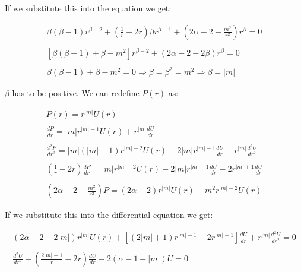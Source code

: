 If we substitute this into the equation we get:

\begin{equation}
  \begin{array}{c}
    \beta(\beta-1)r^{\beta-2}+ \left(\frac{1}{r}-2r\right)\beta r^{\beta-1} + (2\alpha-2-\frac{m^2}{r^2})r^\beta = 0
    \\

    \\
    \left[\beta(\beta-1)+\beta-m^2\right]r^{\beta-2}+(2\alpha-2-2\beta)r^\beta = 0
    \\

    \\
    \beta(\beta-1)+\beta-m^2 = 0 \Rightarrow \beta = \beta^2 = m^2 \Rightarrow \beta = |m|
  \end{array}
\end{equation}

$\beta$ has to be positive. We can redefine $P(r)$ as:

\begin{equation}
  \begin{array}{c}
    P(r) = r^{|m|} U(r)
    \\

    \\
    \frac{d P}{dr} = |m| r^{|m|-1} U(r) + r^{|m|} \frac{dU}{dr}
    \\

    \\
    \frac{d^2 P}{dr^2} = |m| (|m|-1) r^{|m|-2} U(r) + 2 |m| r^{|m|-1} \frac{dU}{dr} + r^{|m|} \frac{d^2U}{dr^2}
    \\

    \\
    \left(\frac{1}{r}-2r\right) \frac{dP}{dr} = |m|r^{|m|-2} U(r) - 2 |m| r^{|m|-1} \frac{dU}{dr} - 2 r^{|m|+1} \frac{dU}{dr}
    \\

    \\
    \left(2\alpha-2-\frac{m^2}{r^2}\right)P = (2\alpha-2) r^{|m|} U(r) - m^2 r^{|m|-2} U(r)
  \end{array}
\end{equation}

If we substitute this into the differential equation we get:

\begin{equation}
  \begin{array}{c}
    (2\alpha-2-2|m|) r^{|m|}U(r) + \left[(2|m|+1)r^{|m|-1}-2r^{|m|+1}\right]\frac{dU}{dr} +r^{|m|} \frac{d^2U}{dr^2} = 0
    \\

    \\
    \frac{d^2U}{dr^2}+ \left(\frac{2|m|+1}{r}-2r\right)\frac{dU}{dr} + 2(\alpha-1-|m|) U = 0
  \end{array}
\end{equation}

